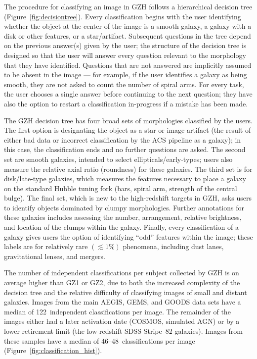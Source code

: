 \documentclass[twocolumn]{aastex6}
\begin{document}
The procedure for classifying an image in GZH follows a hierarchical decision tree (Figure~\ref{fig:decisiontree}). Every classification begins with the user identifying whether the object at the center of the image is a smooth galaxy, a galaxy with a disk or other features, or a star/artifact. Subsequent questions in the tree depend on the previous answer(s) given by the user; the structure of the decision tree is designed so that the user will answer every question relevant to the morphology that they have identified. Questions that are not answered are implicitly assumed to be absent in the image --- for example, if the user identifies a galaxy as being smooth, they are not asked to count the number of spiral arms. For every task, the user chooses a single answer before continuing to the next question; they have also the option to restart a classification in-progress if a mistake has been made. 

The GZH decision tree has four broad sets of morphologies classified by the users. The first option is designating the object as a star or image artifact (the result of either bad data or incorrect classification by the ACS pipeline as a galaxy); in this case, the classification ends and no further questions are asked. The second set are smooth galaxies, intended to select ellipticals/early-types; users also measure the relative axial ratio (roundness) for these galaxies. The third set is for disk/late-type galaxies, which measures the features necessary to place a galaxy on the standard Hubble tuning fork (bars, spiral arm, strength of the central bulge). The final set, which is new to the high-redshift targets in GZH, asks users to identify objects dominated by clumpy morphologies. Further annotations for these galaxies includes assessing the number, arrangement, relative brightness, and location of the clumps within the galaxy. Finally, every classification of a galaxy gives users the option of identifying ``odd'' features within the image; these labels are for relatively rare $(\lesssim1\%)$ phenomena, including dust lanes, gravitational lenses, and mergers. 

The number of independent classifications per subject collected by GZH is on average higher than GZ1 or GZ2, due to both the increased complexity of the decision tree and the relative difficulty of classifying images of small and distant galaxies. Images from the main AEGIS, GEMS, and GOODS data sets have a median of 122~independent classifications per image. The remainder of the images either had a later activation date (COSMOS, simulated AGN) or by a lower retirement limit (the low-redshift SDSS Stripe~82 galaxies). Images from these samples have a median of 46--48~classifications per image (Figure~\ref{fig:classification_hist}).
\end{document}
